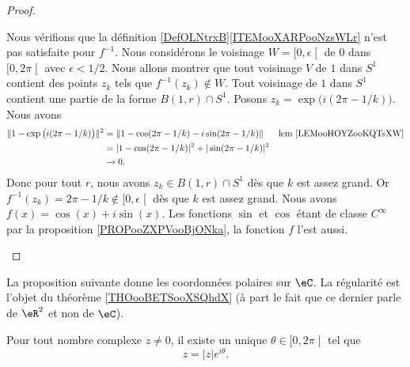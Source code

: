 \begin{proof}
\begin{subproof}
		Nous vérifions que la définition \ref{DefOLNtrxB}\ref{ITEMooXARPooNzsWLr} n'est pas satisfaite pour \( f^{-1}\). Nous considérons le voisinage \( W=\mathopen[ 0,\epsilon\mathclose[\) de \( 0\) dans \( \mathopen[ 0,2\pi\mathclose[\) avec \( \epsilon<1/2\). Nous allons montrer que tout voisinage \( V\) de \( 1\) dans \( S^1\) contient des points \( z_k\) tels que \( f^{-1}(z_k)\not\in W\). Tout voisinage de \( 1\) dans \( S^1\) contient une partie de la forme \( B(1,r)\cap S^1\). Posons \( z_k=\exp\big( i(2\pi-1/k) \big)\). Nous avons
		\begin{subequations}
			\begin{align}
				\| 1-\exp\big( i(2\pi-1/k) \big) \|^2 & =\| 1-\cos(2\pi-1/k)-i\sin(2\pi-1/k) \|      & \text{lem \ref{LEMooHOYZooKQTsXW}} \\
				                                      & =| 1-\cos(2\pi-1/k) |^2+| \sin(2\pi-1/k) |^2                                      \\
				                                      & \to 0.
			\end{align}
		\end{subequations}
		Donc pour tout \( r\), nous avons \( z_k\in B(1,r)\cap S^1\) dès que \( k\) est assez grand. Or \( f^{-1}(z_k)=2\pi-1/k\not\in \mathopen[ 0,\epsilon\mathclose[\) dès que \( k\) est assez grand.
		Nous avons \( f(x)=\cos(x)+i\sin(x)\). Les fonctions \( \sin\) et \( \cos\) étant de classe \( C^{\infty}\) par la proposition \ref{PROPooZXPVooBjONka}, la fonction \( f\) l'est aussi.
	\end{subproof}
\end{proof}


La proposition suivante donne les coordonnées polaires sur \( \eC\). La régularité est l'objet du théorème \ref{THOooBETSooXSQhdX} (à part le fait que ce dernier parle de \( \eR^2\) et non de \( \eC\)).
\begin{proposition}     \label{PROPooRFMKooURhAQJ}
	Pour tout nombre complexe \( z\neq 0\), il existe un unique \( \theta\in\mathopen[ 0 , 2\pi \mathclose[\) tel que
	\begin{equation}
		z=| z | e^{i\theta}.
	\end{equation}
\end{proposition}

